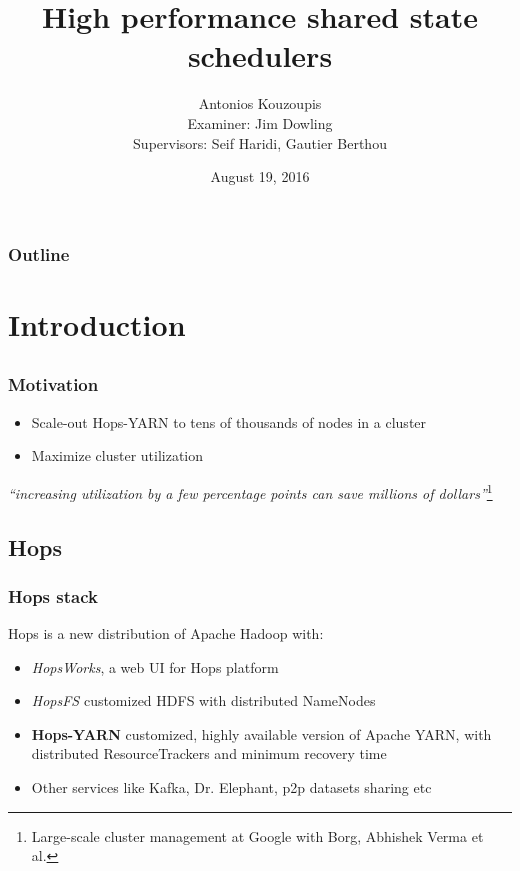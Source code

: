 \documentclass{beamer}
\title{High performance shared state schedulers}
\author[AK]{Antonios Kouzoupis\\[1em]{\footnotesize Examiner: Jim
    Dowling\\Supervisors: Seif Haridi, Gautier Berthou}}
\institute[KTH/SICS]{}
\date[date]{August 19, 2016}
\begin{document}
\section{}
\begin{frame}
\titlepage
\end{frame}

\section*{}
\begin{frame}
\frametitle{Outline}
\footnotesize
\tableofcontents
\normalsize
\end{frame}

\section{Introduction}
\subsection*{}
\begin{frame}
\frametitle{Motivation}

\begin{itemize}
\item Scale-out Hops-YARN to tens of thousands of nodes in a cluster
\item Maximize cluster utilization
\end{itemize}

\centering
\vfill
\emph{``increasing utilization by a few percentage points can save millions
of dollars''}\footnote{Large-scale cluster management at Google with
  Borg, Abhishek Verma et al.}
\end{frame}

\subsection{Hops}
\begin{frame}
\frametitle{Hops stack}
Hops is a new distribution of Apache Hadoop with:
\begin{itemize}
\item \emph{HopsWorks}, a web UI for Hops platform
\item \emph{HopsFS} customized HDFS with distributed NameNodes
\item \textbf{Hops-YARN} customized, highly available version of Apache
  YARN, with distributed ResourceTrackers and minimum recovery time
\item Other services like Kafka, Dr. Elephant, p2p datasets sharing etc
\end{itemize}
\end{frame}
\end{document}
